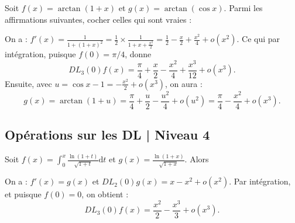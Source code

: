 \begin{question}
Soit $\displaystyle f(x)=\arctan (1+x)$ et $\displaystyle g(x)=\arctan (\cos x)$. Parmi les affirmations suivantes, cocher celles qui sont vraies :
\begin{answers}  
\end{answers}
\begin{explanations}
On a : $\displaystyle f'(x)=\frac{1}{1+(1+x)^2}=\frac{1}{2}\times\frac{1}{1+x+\frac{x^2}{2}}=\frac{1}{2}-\frac{x}{2}+\frac{x^2}{4}+o(x^2)$. Ce qui par intégration, puisque $f(0)=\pi/4$, donne
$$DL_3(0)f(x)=\frac{\pi}{4}+\frac{x}{2}-\frac{x^2}{4}+\frac{x^3}{12}+o(x^3).$$
Ensuite, avec $\displaystyle u=\cos x-1=-\frac{x^2}{2}+o(x^3)$, on aura : 
$$g(x)=\arctan (1+u)=\frac{\pi}{4}+\frac{u}{2}-\frac{u^2}{4}+o(u^2)=\frac{\pi}{4}-\frac{x^2}{4}+o(x^3).$$ 
\end{explanations}
\end{question}

\subsection{Opérations sur les DL | Niveau 4}

\begin{question}
Soit $\displaystyle f(x)=\int _0^x\frac{\ln (1+t)}{\sqrt{1+t}}\mathrm{d}t$ et $\displaystyle g(x)=\frac{\ln (1+x)}{\sqrt{1+x}}$. Alors
\begin{answers}  
\end{answers}
\begin{explanations}
On a : $\displaystyle f'(x)=g(x)$ et $DL_2(0)g(x)=x-x^2+o(x^2)$. Par intégration, et puisque $f(0)=0$, on obtient :
$$DL_3(0)f(x)=\frac{x^2}{2}-\frac{x^3}{3}+o(x^3).$$
\end{explanations}
\end{question}

